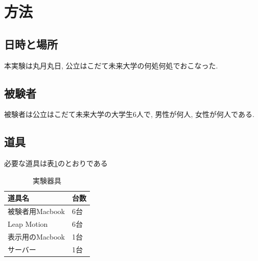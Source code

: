 \documentclass{funthesis}
\begin{document}



\section{方法}
\subsection{日時と場所}

本実験は丸月丸日, 公立はこだて未来大学の何処何処でおこなった. 

\subsection{被験者}
被験者は公立はこだて未来大学の大学生6人で, 男性が何人, 女性が何人である. 

\subsection{道具}
必要な道具は表\ref{tools}のとおりである

\begin{table}[H]
\begin{center}
\caption{実験器具}
  \begin{tabular}{ll}
   \hline
   道具名 & 台数\\
   \hline
   被験者用Macbook & 6台\\
   \hline
   Leap Motion & 6台\\ 
   \hline
   表示用のMacbook & 1台\\ 
   \hline
  サーバー & 1台\\ 
   \hline
   \end{tabular}
   \label{tools}
  \end{center}
\end{table}
\end{document}
